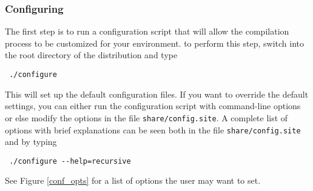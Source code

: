\subsubsection{Configuring}\label{configuring}

The first step is to run a configuration script that will allow the
compilation process to be customized for your environment. to perform this
step, switch into the root directory of the distribution and type
{\color{Brown}
\begin{verbatim}
 ./configure 
\end{verbatim}
} This will set up the default configuration files. If you want to override
the default settings, you can either run the configuration script with
command-line options or else modify the options in the file
{\color{Brown}\texttt{share/config.site}}. A complete list of options with
brief explanations can be seen both in the file
{\color{Brown}\texttt{share/config.site}} and by typing 
{\color{Brown}
\begin{verbatim}
 ./configure --help=recursive 
\end{verbatim}
}
See Figure \ref{conf_opts} for a list of options the user may want to set. 

